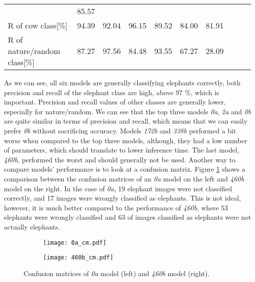 \begin{table}[ht]
{\begin{tabular}{lrrrrrrrrr}
                                        & \cellcolor{tbred}85.57\\
        R of cow class[\%]              & \cellcolor{tbgreeny}94.39     
                                        & \cellcolor{tbyellow}92.04   
                                        & \cellcolor{tbgreen}96.15   
                                        & \cellcolor{tbyellow}89.52  
                                        & \cellcolor{tbyellow}84.00  
                                        & \cellcolor{tbred}81.91\\
        R of nature/random class[\%]    & \cellcolor{tbyellow}87.27     
                                        & \cellcolor{tbgreen}97.56   
                                        & \cellcolor{tbyellow}84.48   
                                        & \cellcolor{tbgreeny}93.55  
                                        & \cellcolor{tbyellow}67.27  
                                        & \cellcolor{tbred}28.09\\\bottomrule
    \end{tabular}}
    \label{precision_recall_table}
\end{table}

As we can see, all six models are generally classifying elephants correctly, both precision and recall of the elephant class are high, above 97 \%, which is important.
Precision and recall values of other classes are generally lower, especially for nature/random.
We can see that the top three models \textit{0a}, \textit{2a} and \textit{0b} are quite similar in terms of precision and recall, which means that we can easily prefer \textit{0b} without sacrificing accuracy. 
Models \textit{172b} and \textit{338b} performed a bit worse when compared to the top three models, although, they had a low number of parameters, which should translate to lower inference time.
The last model, \textit{460b}, performed the worst and should generally not be used.
\clearpage
Another way to compare models' performance is to look at a confusion matrix.
Figure \ref{double_cm} shows a comparison between the confusion matrices of an \textit{0a} model on the left and \textit{460b} model on the right.
In the case of \textit{0a}, 19 elephant images were not classified correctly, and 17 images were wrongly classified as elephants.
This is not ideal, however, it is much better compared to the performance of \textit{460b}, where 53 elephants were wrongly classified and 63 of images classified as elephants were not actually elephants.
\newline
\begin{figure}[ht]
    \begin{subfigure}{0.5\textwidth}
        \centering
        \texttt{[image: 0a\_cm.pdf]} 
    \end{subfigure}
    \begin{subfigure}{0.5\textwidth}
        \centering
        \texttt{[image: 460b\_cm.pdf]}
    \end{subfigure}
    \caption{Confusion matrices of \textit{0a} model (left) and \textit{460b} model (right).}
    \label{double_cm}
\end{figure}

